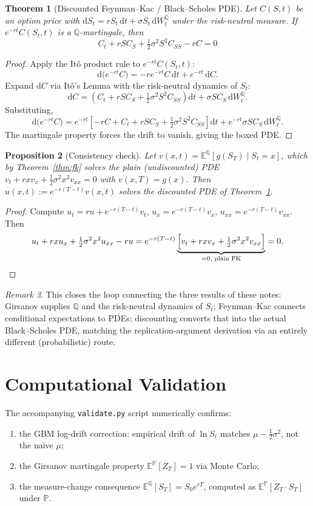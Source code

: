 \documentclass[11pt]{article}
\newtheorem{theorem}{Theorem}[section]
\newtheorem{proposition}[theorem]{Proposition}
\theoremstyle{definition}
\theoremstyle{remark}
\newtheorem{remark}[theorem]{Remark}
\newcommand{\dd}{\mathrm{d}}
\newcommand{\E}{\mathbb{E}}
\renewcommand{\P}{\mathbb{P}}
\newcommand{\Q}{\mathbb{Q}}
\begin{document}
\begin{theorem}[Discounted Feynman--Kac / Black--Scholes PDE]
\label{thm:bspde}
Let $C(S,t)$ be an option price with $\dd S_t = rS_t\,\dd t+\sigma S_t\,\dd W_t^\Q$ under the
risk-neutral measure. If $e^{-rt}C(S_t,t)$ is a $\Q$-martingale, then
\[
\boxed{\ C_t + rSC_S + \tfrac12\sigma^2S^2C_{SS} - rC = 0\ }
\]
\end{theorem}

\begin{proof}
Apply the Itô product rule to $e^{-rt}C(S_t,t)$:
\[
\dd\big(e^{-rt}C\big) = -re^{-rt}C\,\dd t + e^{-rt}\,\dd C.
\]
Expand $\dd C$ via Itô's Lemma with the risk-neutral dynamics of $S_t$:
\[
\dd C = \left(C_t + rSC_S+\tfrac12\sigma^2S^2C_{SS}\right)\dd t + \sigma SC_S\,\dd W_t^\Q.
\]
Substituting,
\[
\dd\big(e^{-rt}C\big) = e^{-rt}\!\left[-rC+C_t+rSC_S+\tfrac12\sigma^2S^2C_{SS}\right]\dd t
+ e^{-rt}\sigma SC_S\,\dd W_t^\Q.
\]
The martingale property forces the drift to vanish, giving the boxed PDE.
\end{proof}

\begin{proposition}[Consistency check]
Let $v(x,t) = \E^\Q[g(S_T)\mid S_t=x]$, which by Theorem~\ref{thm:fk} solves the plain
(undiscounted) PDE $v_t+rxv_x+\tfrac12\sigma^2x^2v_{xx}=0$ with $v(x,T)=g(x)$. Then
$u(x,t) := e^{-r(T-t)}v(x,t)$ solves the discounted PDE of Theorem~\ref{thm:bspde}.
\end{proposition}

\begin{proof}
Compute $u_t = ru + e^{-r(T-t)}v_t$, $u_x = e^{-r(T-t)}v_x$, $u_{xx}=e^{-r(T-t)}v_{xx}$. Then
\[
u_t+rxu_x+\tfrac12\sigma^2x^2u_{xx}-ru
= e^{-r(T-t)}\underbrace{\Big[v_t+rxv_x+\tfrac12\sigma^2x^2v_{xx}\Big]}_{=0\text{, plain FK}} = 0. \qedhere
\]
\end{proof}

\begin{remark}
This closes the loop connecting the three results of these notes: Girsanov supplies $\Q$ and the
risk-neutral dynamics of $S_t$; Feynman--Kac connects conditional expectations to PDEs; discounting
converts that into the actual Black--Scholes PDE, matching the replication-argument derivation via
an entirely different (probabilistic) route.
\end{remark}

\section*{Computational Validation}

The accompanying \texttt{validate.py} script numerically confirms:
\begin{enumerate}[label=(\roman*)]
\item the GBM log-drift correction: empirical drift of $\ln S_t$ matches $\mu-\tfrac12\sigma^2$, not the naive $\mu$;
\item the Girsanov martingale property $\E^\P[Z_T]=1$ via Monte Carlo;
\item the measure-change consequence $\E^\Q[S_T] = S_0e^{rT}$, computed as $\E^\P[Z_T\cdot S_T]$ under $\P$.
\end{enumerate}
\end{document}
